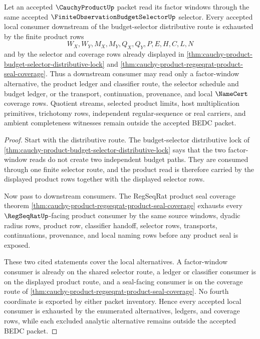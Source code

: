\begin{lemma}
\label{lem:cauchy-product-budget-selector-downstream-coverage}
Let an accepted $\CauchyProductUp$ packet read its factor windows through the same accepted $\FiniteObservationBudgetSelectorUp$ selector. Every accepted local consumer downstream of the budget-selector distributive route is exhausted by the finite product rows
$$
W_X,W_Y,M_X,M_Y,Q_X,Q_Y,P,E,H,C,L,N
$$
and by the selector and coverage rows already displayed in \autoref{thm:cauchy-product-budget-selector-distributive-lock} and \autoref{thm:cauchy-product-regseqrat-product-seal-coverage}. Thus a downstream consumer may read only a factor-window alternative, the product ledger and classifier route, the selector schedule and budget ledger, or the transport, continuation, provenance, and local $\NameCert$ coverage rows. Quotient streams, selected product limits, host multiplication primitives, trichotomy rows, independent regular-sequence or real carriers, and ambient completeness witnesses remain outside the accepted BEDC packet.
\end{lemma}
\begin{proof}
Start with the distributive route. The budget-selector distributive lock of \autoref{thm:cauchy-product-budget-selector-distributive-lock} says that the two factor-window reads do not create two independent budget paths. They are consumed through one finite selector route, and the product read is therefore carried by the displayed product rows together with the displayed selector rows.

Now pass to downstream consumers. The RegSeqRat product seal coverage theorem \autoref{thm:cauchy-product-regseqrat-product-seal-coverage} exhausts every $\RegSeqRatUp$-facing product consumer by the same source windows, dyadic radius rows, product row, classifier handoff, selector rows, transports, continuations, provenance, and local naming rows before any product seal is exposed.

These two cited statements cover the local alternatives. A factor-window consumer is already on the shared selector route, a ledger or classifier consumer is on the displayed product route, and a seal-facing consumer is on the coverage route of \autoref{thm:cauchy-product-regseqrat-product-seal-coverage}. No fourth coordinate is exported by either packet inventory. Hence every accepted local consumer is exhausted by the enumerated alternatives, ledgers, and coverage rows, while each excluded analytic alternative remains outside the accepted BEDC packet.
\end{proof}

